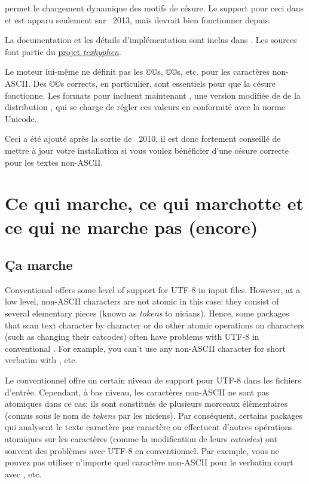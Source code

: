 \documentclass{lltxdoc}
\begin{document}
\luatex permet le chargement dynamique des motifs de césure. Le support pour ceci
dans  et  est apparu seulement sur \texlive{}~2013,
mais devrait bien fonctionner depuis.

La documentation et les détails d'implémentation sont inclus dans .
Les sources font partie du \href{http://tug.org/tex-hyphen/}{projet \emph{texhyphen}}.


Le moteur lui-même ne définit pas les ©\catcode©s, ©\lccode©s, etc. pour les
caractères non-ASCII. Des ©\lccode©s corrects, en particulier, sont essentiels
pour que la césure fonctionne. Les formats pour \luatex incluent maintenant
, une version modifiée de 
de la distribution \xetex, qui se charge de régler ces valeurs en conformité avec
la norme Unicode.

Ceci a été ajouté après la sortie de \texlive{}~2010, il est donc fortement conseillé
de mettre à jour votre installation si vous voulez bénéficier d'une césure correcte
pour les textes non-ASCII.


\section{Ce qui marche, ce qui marchotte et ce qui ne marche pas (encore)}\label{workornot}

\subsection{Ça marche}\label{working}

Conventional \latex offers some level of support for UTF-8 in input files.
However, at a low level, non-ASCII characters are not atomic in this case:
they consist of several elementary pieces (known as \emph{tokens} to
\tex{}nicians). Hence, some packages that scan text character by character or
do other atomic operations on characters (such as changing their catcodes)
often have problems with UTF-8 in conventional \latex. For example, you can't
use any non-ASCII character for short verbatim with , etc.

Le \latex conventionnel offre un certain niveau de support pour UTF-8 dans les fichiers d'entrée. Cependant, à bas niveau, les caractères non-ASCII ne sont pas atomiques dans ce cas: ils sont constitués de plusieurs morceaux élémentaires (connus sous le nom de \emph{tokens} par les \tex{}niciens). Par conséquent, certains packages qui analysent le texte caractère par caractère ou effectuent d'autres opérations atomiques sur les caractères (comme la modification de leurs \emph{catcodes}) ont souvent des problèmes avec UTF-8 en \latex conventionnel. Par exemple, vous ne pouvez pas utiliser n'importe quel caractère non-ASCII pour le verbatim court avec , etc.
\end{document}
